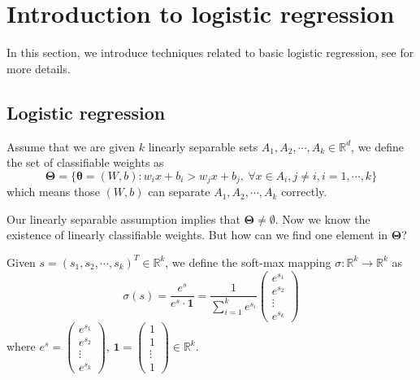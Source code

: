 \newpage  
\section{Introduction to logistic regression}
In this section, we introduce techniques related to basic logistic regression, see \cite{gelman2006data} for more details.
\subsection{Logistic regression}\label{sec:LR}

Assume that we are given $k$ linearly separable sets $A_1,A_2,\cdots,A_k\in \mathbb{R}^d$, we define the set of classifiable weights as
	\begin{equation}
	\bm\Theta = \{\bm\theta = (W,b): w_ix+b_i>w_jx+b_j,~\forall x\in A_i, j\neq i, i= 1,\cdots,k\}
	\end{equation}
	which means those $(W,b)$ can separate $A_1,A_2,\cdots,A_k$ correctly. 
	

Our linearly separable assumption implies that $\bm\Theta\neq \emptyset$. 
Now we know the existence of linearly classifiable weights. But how can we find one element in $\bm\Theta$?

\begin{definition}\label{softmax}
 Given $s = (s_1,s_2,\cdots,s_k)^T\in \mathbb{R}^k$, we define the soft-max mapping $\sigma: \mathbb{R}^k \rightarrow\mathbb{R}^k $ as
 \begin{equation}
 \sigma(s)  = \frac{e^{s}}{e^{s}\cdot \bm{1}} = \frac{1}{\sum\limits_{i=1}^k e^{s_i}}
 \begin{pmatrix}
 e^{s_1}\\
 e^{s_2}\\
 \vdots\\
 e^{s_k}
 \end{pmatrix}
 \end{equation}
 where $e^{s} = 
 \begin{pmatrix}
 e^{s_1}\\
 e^{s_2}\\
 \vdots\\
 e^{s_k}
 \end{pmatrix}
 $, $\bm{1} = 
 \begin{pmatrix}
 1\\
 1 \\
 \vdots \\
 1
 \end{pmatrix} \in\mathbb{R}^k$.
\end{definition}


